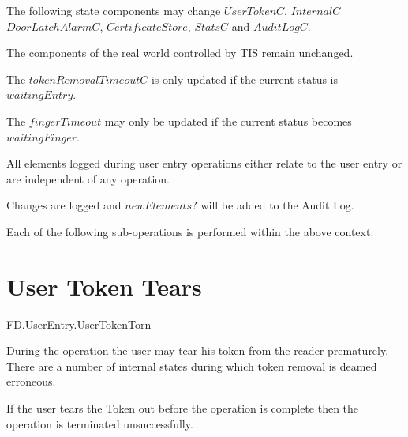 \begin{Zcomment}
\item
The following state components may change $UserTokenC$, $InternalC$
$DoorLatchAlarmC$, $CertificateStore$, $StatsC$ and $AuditLogC$.
\item
The components of the real world controlled by TIS remain unchanged.
\item
The $tokenRemovalTimeoutC$ is only updated if the current status is
$waitingEntry$.
\item
The $fingerTimeout$ may only be updated if the current status becomes
$waitingFinger$.
\item
All elements logged during user entry operations either relate to the
user entry or are independent of any operation.
\item
Changes are logged and $newElements?$ will be added to the Audit Log.
\end{Zcomment}

Each of the following sub-operations is performed within the above context.

\section{User Token Tears}
\begin{traceunit}{FD.UserEntry.UserTokenTorn}
\end{traceunit}

During the operation the user may tear his token from the reader
prematurely. There are a number of internal states during which token
removal is deamed erroneous.

If the user tears the Token out before the operation is complete then
the operation is terminated unsuccessfully.

